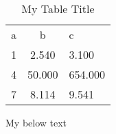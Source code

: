 \begin{table}
\centering
\begin{threeparttable}
\caption{My Table Title}
\begin{tabular}{lS[table-column-width=4cm]s}
\toprule
a & b & c\\
1 &  2.540 &   3.100 \\
4 & 50.000 & 654.000 \\
7 &  8.114 &   9.541 \\
\bottomrule

\end{tabular}
\begin{tablenotes}
My below text
\end{tablenotes}
\end{threeparttable}
\end{table}